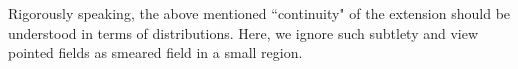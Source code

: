 \documentclass[12pt,b5paper,notitlepage]{article}
\theoremstyle{definition}
\newtheorem{rem}[df]{Remark}
\theoremstyle{plain}
\newcommand{\mc}{\mathcal}
\newcommand{\wtd}{\widetilde}
\newcommand{\sgm}{\varsigma}
\newcommand{\Rbb}{\mathbb R}
\numberwithin{equation}{section}
\begin{document}
Rigorously speaking, the above mentioned ``continuity" of the extension should be understood in terms of distributions. Here, we ignore such subtlety and view pointed fields as smeared field in a small region.


\begin{comment}
\begin{rem}\label{lb5}
Recall that we have said that a pointed field should also be viewed as a smeared field localized on a small region. Otherwise, the RHS of \eqref{eq8} still belongs to $\mc H$ in the interior of \eqref{eq9}, but not so on the boundary. Thus, a more rigorous interpretation of Conc. \ref{lb4} should be as follows: If $O_1,\dots,O_n$ are spacelike separated regions of $\Rbb^2$ (i.e. for each $(u_i,v_i)\in O_i$ and $(u_j,v_j)\in O_j$ where $i\neq j$, we have \eqref{eq7}), and if $f_i\in C_c^\infty(O_i)$, then the function
\begin{align}\label{eq10}
\begin{aligned}
\int_{O_1}\cdots\int_{O_n}& \wtd\Phi_1(u_1+\tau_1,v_1+\sgm_1)\cdots\wtd\Phi(u_n+\tau_n,v_n+\sgm_n)\Omega \\
&\cdot f_1(u_1,v_1)\cdots f_n(u_n,v_n)\cdot  d(u_1,v_1)\cdots d(u_n,v_n)
\end{aligned}
\end{align}
of $(\tau_1,\sgm_1,\dots,\tau_n,\sgm_n)$ is continuous on \eqref{eq9} and holomorphic on its interior.
\end{rem}
\end{comment}




\subsection{}

\end{document}
